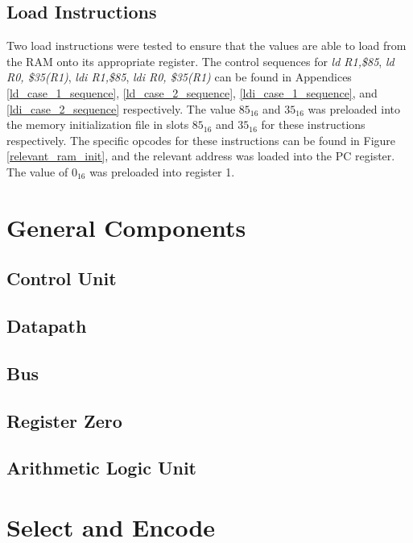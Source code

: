 \documentclass{article}
\begin{document}
    \subsection{Load Instructions}
        Two load instructions were tested to ensure that the values are able to load from the RAM onto its appropriate register. The control sequences for \emph{ld R1,\$85}, \emph{ld R0, \$35(R1)}, \emph{ldi R1,\$85}, \emph{ldi R0, \$35(R1)} can be found in Appendices \ref{ld_case_1_sequence}, \ref{ld_case_2_sequence}, \ref{ldi_case_1_sequence}, and \ref{ldi_case_2_sequence} respectively. The value $85_{16}$ and $35_{16}$ was preloaded into the memory initialization file in slots $85_{16}$ and $35_{16}$ for these instructions respectively. The specific opcodes for these instructions can be found in Figure \ref{relevant_ram_init}, and the relevant address was loaded into the PC register. The value of $0_{16}$ was preloaded into register 1.
       
       

\cleardoublepage

\appendix
\section{General Components}
    \subsection{Control Unit} \label{control_unit.v}
        
    \subsection{Datapath} \label{datapath.v}
        
    \subsection{Bus} \label{Bus.v}
         
    \subsection{Register Zero} \label{register_zero.v}
         
    \subsection{Arithmetic Logic Unit} \label{ALU.v}
        
\section{Select and Encode}
     \label{select_and_encode.v}
\end{document}
